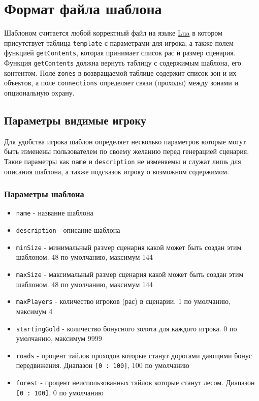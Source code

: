 \section{Формат файла шаблона}
Шаблоном считается любой корректный файл на языке \href{https://www.lua.org/}{Lua} в котором присутствует таблица \texttt{template} с параметрами для игрока, а также полем-функцией \texttt{getContents}, которая принимает список рас и размер сценария. Функция \texttt{getContents} должна вернуть таблицу с содержимым шаблона, его контентом. Поле \texttt{zones} в возвращаемой таблице содержит список зон и их объектов, а поле \texttt{connections} определяет связи (проходы) между зонами и опциональную охрану.

\subsection{Параметры видимые игроку}
Для удобства игрока шаблон определяет несколько параметров которые могут быть изменены пользователем по своему желанию перед генерацией сценария. Такие параметры как \texttt{name} и \texttt{description} не изменяемы и служат лишь для описания шаблона, а также подсказок игроку о возможном содержимом.

\subsubsection{Параметры шаблона}
\begin{itemize}
\item \texttt{name} - название шаблона
\item \texttt{description} - описание шаблона
\item \texttt{minSize} - минимальный размер сценария какой может быть создан этим шаблоном. 48 по умолчанию, максимум 144
\item \texttt{maxSize} - максимальный размер сценария какой может быть создан этим шаблоном. 48 по умолчанию, максимум 144
\item \texttt{maxPlayers} - количество игроков (рас) в сценарии. 1 по умолчанию, максимум 4
\item \texttt{startingGold} - количество бонусного золота для каждого игрока. 0 по умолчанию, максимум 9999
\item \texttt{roads} - процент тайлов проходов которые станут дорогами дающими бонус передвижения. Диапазон \texttt{[0 : 100]}, 100 по умолчанию
\item \texttt{forest} - процент неиспользованных тайлов которые станут лесом. Диапазон \texttt{[0 : 100]}, 0 по умолчанию
\end{itemize}

